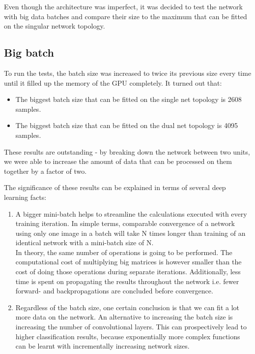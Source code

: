 \documentclass[a4paper, 11pt]{article}
\numberwithin{equation}{section}
\begin{document}
	Even though the architecture was imperfect, it was decided to test the network with big data batches and compare their size to the maximum that can be fitted on the singular network topology.
	
	\subsection{Big batch}
	
	To run the tests, the batch size was increased to twice its previous size every time until it filled up the memory of the GPU completely. It turned out that:
	\begin{itemize}
		\item The biggest batch size that can be fitted on the single net topology is 2608 samples.
		\item The biggest batch size that can be fitted on the dual net topology is 4095 samples.
	\end{itemize}
	
	These results are outstanding - by breaking down the network between two units, we were able to increase the amount of data that can be processed on them together by a factor of two.
	
	The significance of these results can be explained in terms of several deep learning facts:
	\begin{enumerate}
		\item A bigger mini-batch helps to streamline the calculations executed with every training iteration. In simple terms, comparable convergence of a network using only one image in a batch will take N times longer than training of an identical network with a mini-batch size of N. \\ In theory, the same number of operations is going to be performed. The computational cost of multiplying big matrices is however smaller than the cost of doing those operations during separate iterations. Additionally, less time is spent on propagating the results throughout the network i.e. fewer forward- and backpropagations are concluded before convergence.
		\item Regardless of the batch size, one certain conclusion is that we can fit a lot more data on the network. An alternative to increasing the batch size is increasing the number of convolutional layers. This can prospectively lead to higher classification results, because exponentially more complex functions can be learnt with incrementally increasing network sizes.
	\end{enumerate}
\end{document}
